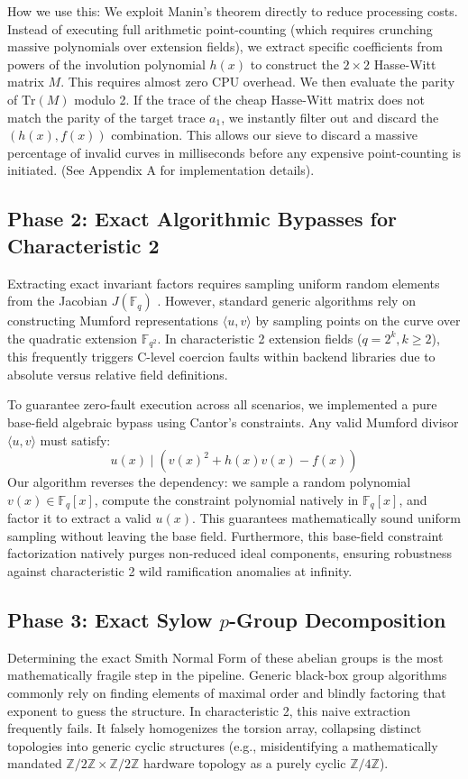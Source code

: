 \documentclass[letterpaper, 11pt]{article}
\begin{document}
How we use this: We exploit Manin's theorem directly to reduce processing costs. Instead of executing full arithmetic point-counting (which requires crunching massive polynomials over extension fields), we extract specific coefficients from powers of the involution polynomial $h(x)$ to construct the $2 \times 2$ Hasse-Witt matrix $M$. This requires almost zero CPU overhead. We then evaluate the parity of $\text{Tr}(M)$ modulo 2. If the trace of the cheap Hasse-Witt matrix does not match the parity of the target trace $a_1$, we instantly filter out and discard the $(h(x), f(x))$ combination. This allows our sieve to discard a massive percentage of invalid curves in milliseconds before any expensive point-counting is initiated. (See Appendix A for implementation details).

\subsection{Phase 2: Exact Algorithmic Bypasses for Characteristic 2}
Extracting exact invariant factors requires sampling uniform random elements from the Jacobian $J(\mathbb{F}_q)$ \cite{Sutherland2007}. However, standard generic algorithms rely on constructing Mumford representations $\langle u, v \rangle$ \cite{Cantor1987} by sampling points on the curve over the quadratic extension $\mathbb{F}_{q^2}$. In characteristic 2 extension fields ($q = 2^k, k \ge 2$), this frequently triggers C-level coercion faults within backend libraries due to absolute versus relative field definitions.

To guarantee zero-fault execution across all scenarios, we implemented a pure base-field algebraic bypass using Cantor's constraints. Any valid Mumford divisor $\langle u, v \rangle$ must satisfy:
\begin{equation}
    u(x) \mid \left( v(x)^2 + h(x)v(x) - f(x) \right)
\end{equation}
Our algorithm reverses the dependency: we sample a random polynomial $v(x) \in \mathbb{F}_q[x]$, compute the constraint polynomial natively in $\mathbb{F}_q[x]$, and factor it to extract a valid $u(x)$. This guarantees mathematically sound uniform sampling without leaving the base field. Furthermore, this base-field constraint factorization natively purges non-reduced ideal components, ensuring robustness against characteristic 2 wild ramification anomalies at infinity.

\subsection{Phase 3: Exact Sylow \texorpdfstring{$p$}{p}-Group Decomposition}
Determining the exact Smith Normal Form of these abelian groups is the most mathematically fragile step in the pipeline. Generic black-box group algorithms commonly rely on finding elements of maximal order and blindly factoring that exponent to guess the structure. In characteristic 2, this naive extraction frequently fails. It falsely homogenizes the torsion array, collapsing distinct topologies into generic cyclic structures (e.g., misidentifying a mathematically mandated $\mathbb{Z}/2\mathbb{Z} \times \mathbb{Z}/2\mathbb{Z}$ hardware topology as a purely cyclic $\mathbb{Z}/4\mathbb{Z}$). 
\end{document}
